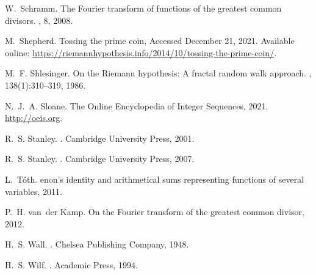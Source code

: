 \documentclass[12pt,reqno,a4letter]{article}
\numberwithin{figure}{section}
\numberwithin{table}{section}
\numberwithin{equation}{section}
\theoremstyle{plain}
\numberwithin{theorem}{section}
\theoremstyle{definition}
\begin{document}
\begin{thebibliography}{10}
W.~Schramm.
\newblock The {F}ourier transform of functions of the greatest common divisors.
, 8, 2008.

M.~Shepherd.
\newblock Tossing the prime coin, Accessed December 21, 2021.
\newblock Available online:
  \url{https://riemannhypothesis.info/2014/10/tossing-the-prime-coin/}.

M.~F. Shlesinger.
\newblock On the {R}iemann hypothesis: A fractal random walk approach.
,
  138(1):310--319, 1986.

N.~J.~A. Sloane.
\newblock The {O}nline {E}ncyclopedia of {I}nteger {S}equences, 2021.
\newblock \url{http://oeis.org}.

R.~S. Stanley.
.
\newblock Cambridge University Press, 2001.

R.~S. Stanley.
.
\newblock Cambridge University Press, 2007.

L.~T{\'{o}}th.
enon’s identity and arithmetical sums representing functions of
  several variables, 2011.

P.~H. van~der Kamp.
\newblock On the {F}ourier transform of the greatest common divisor, 2012.

H.~S. Wall.
.
\newblock Chelsea Publishing Company, 1948.

H.~S. Wilf.
.
\newblock Academic Press, 1994.

\end{thebibliography}

\newpage
\label{Section_Glossary_NotationConvs} 
\printglossary[type={symbols},title={Glossary of notation and conventions},nogroupskip=true]

\setcounter{section}{0}
\renewcommand{\thesection}{\Alph{section}}
\renewcommand{\thesubsection}{\Alph{section}.\arabic{subsection}}

\newpage
\titleformat{\section}{\normalfont\Large\bfseries}{\underline{\LARGE\bfseries\scshape{Appendix }\thesection}.}{0.5em}{}
\end{document}

